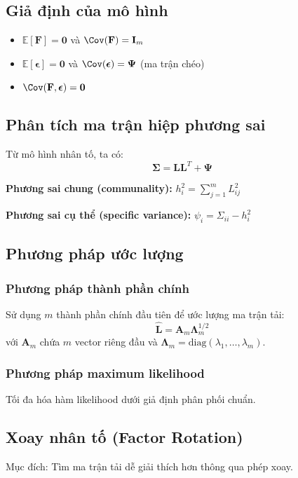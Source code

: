 \subsection{Giả định của mô hình}
\begin{itemize}
    \item $\mathbb{E}[\mathbf{F}] = \mathbf{0}$ và $\Cov(\mathbf{F}) = \mathbf{I}_m$
    \item $\mathbb{E}[\boldsymbol{\epsilon}] = \mathbf{0}$ và $\Cov(\boldsymbol{\epsilon}) = \boldsymbol{\Psi}$ (ma trận chéo)
    \item $\Cov(\mathbf{F}, \boldsymbol{\epsilon}) = \mathbf{0}$
\end{itemize}

\subsection{Phân tích ma trận hiệp phương sai}
Từ mô hình nhân tố, ta có:
\[
\boldsymbol{\Sigma} = \mathbf{L}\mathbf{L}^T + \boldsymbol{\Psi}
\]

\textbf{Phương sai chung (communality):} $h_i^2 = \sum_{j=1}^m L_{ij}^2$

\textbf{Phương sai cụ thể (specific variance):} $\psi_i = \Sigma_{ii} - h_i^2$

\subsection{Phương pháp ước lượng}
\subsubsection*{Phương pháp thành phần chính}
Sử dụng $m$ thành phần chính đầu tiên để ước lượng ma trận tải:
\[
\hat{\mathbf{L}} = \mathbf{A}_m\boldsymbol{\Lambda}_m^{1/2}
\]
với $\mathbf{A}_m$ chứa $m$ vector riêng đầu và $\boldsymbol{\Lambda}_m = \text{diag}(\lambda_1, \ldots, \lambda_m)$.

\subsubsection*{Phương pháp maximum likelihood}
Tối đa hóa hàm likelihood dưới giả định phân phối chuẩn.

\subsection{Xoay nhân tố (Factor Rotation)}
Mục đích: Tìm ma trận tải dễ giải thích hơn thông qua phép xoay.

